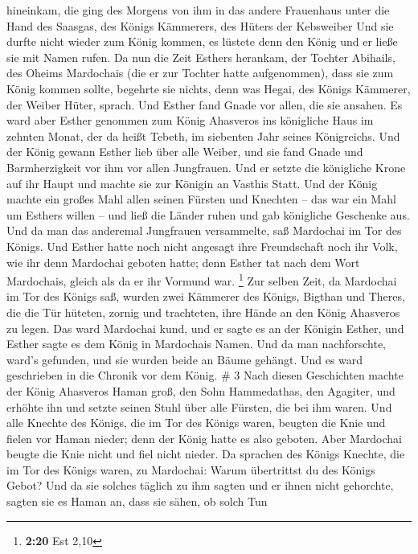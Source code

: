 hineinkam, die ging des Morgens von ihm in das andere Frauenhaus unter
die Hand des Saasgas, des Königs Kämmerers, des Hüters der Kebsweiber
Und sie durfte nicht wieder zum König kommen, es lüstete denn den König
und er ließe sie mit Namen rufen.  Da nun die Zeit
Esthers herankam, der Tochter Abihails, des Oheims Mardochais (die er
zur Tochter hatte aufgenommen), dass sie zum König kommen sollte,
begehrte sie nichts, denn was Hegai, des Königs Kämmerer, der Weiber
Hüter, sprach. Und Esther fand Gnade vor allen, die sie ansahen.
 Es ward aber Esther genommen zum König Ahasveros ins
königliche Haus im zehnten Monat, der da heißt Tebeth, im siebenten Jahr
seines Königreichs.  Und der König gewann Esther lieb
über alle Weiber, und sie fand Gnade und Barmherzigkeit vor ihm vor
allen Jungfrauen. Und er setzte die königliche Krone auf ihr Haupt und
machte sie zur Königin an Vasthis Statt.  Und der König
machte ein großes Mahl allen seinen Fürsten und Knechten -- das war ein
Mahl um Esthers willen -- und ließ die Länder ruhen und gab königliche
Geschenke aus.  Und da man das anderemal Jungfrauen
versammelte, saß Mardochai im Tor des Königs.  Und Esther
hatte noch nicht angesagt ihre Freundschaft noch ihr Volk, wie ihr denn
Mardochai geboten hatte; denn Esther tat nach dem Wort Mardochais,
gleich als da er ihr Vormund war. \footnote{\textbf{2:20} Est 2,10}
 Zur selben Zeit, da Mardochai im Tor des Königs saß,
wurden zwei Kämmerer des Königs, Bigthan und Theres, die die Tür
hüteten, zornig und trachteten, ihre Hände an den König Ahasveros zu
legen.  Das ward Mardochai kund, und er sagte es an der
Königin Esther, und Esther sagte es dem König in Mardochais Namen.
 Und da man nachforschte, ward's gefunden, und sie wurden
beide an Bäume gehängt. Und es ward geschrieben in die Chronik vor dem
König. \# 3  Nach diesen Geschichten machte der König
Ahasveros Haman groß, den Sohn Hammedathas, den Agagiter, und erhöhte
ihn und setzte seinen Stuhl über alle Fürsten, die bei ihm waren.
 Und alle Knechte des Königs, die im Tor des Königs waren,
beugten die Knie und fielen vor Haman nieder; denn der König hatte es
also geboten. Aber Mardochai beugte die Knie nicht und fiel nicht
nieder.  Da sprachen des Königs Knechte, die im Tor des
Königs waren, zu Mardochai: Warum übertrittst du des Königs Gebot?
 Und da sie solches täglich zu ihm sagten und er ihnen
nicht gehorchte, sagten sie es Haman an, dass sie sähen, ob solch Tun

